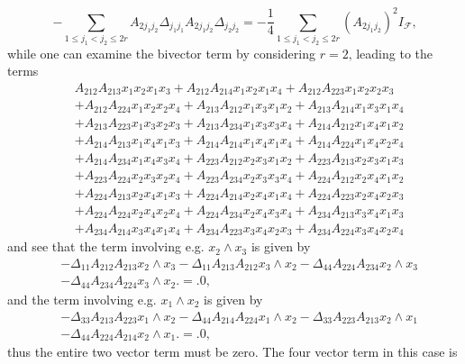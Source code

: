 \documentclass[aps, preprint]{revtex4}
\begin{document}
\begin{equation} -\sum _{1 \leq j_{1} <j_{2} \leq 2 r}A_{2 j_{1} j_{2}}  \Delta _{j_{1} j_{1}}A_{2 j_{1} j_{2}} \Delta _{j_{2} j_{2}} = -\frac{1}{4} \sum _{1 \leq j_{1} <j_{2} \leq 2 r}\left (A_{2 j_{1} j_{2}}\right )^{2} I_{\mathcal{F}}\text{,}
\end{equation}while one can examine the bivector term by considering $r =2\text{,}$ leading to the terms
\begin{align} & A_{2 1 2} A_{2 1 3} x_{1} x_{2} x_{1} x_{3} +A_{2 1 2} A_{2 1 4} x_{1} x_{2} x_{1} x_{4} +A_{2 1 2} A_{2 2 3} x_{1} x_{2} x_{2} x_{3} \nonumber  \\
 &  +A_{2 1 2} A_{2 2 4} x_{1} x_{2} x_{2} x_{4} +A_{2 1 3} A_{2 1 2} x_{1} x_{3} x_{1} x_{2} +A_{2 1 3} A_{2 1 4} x_{1} x_{3} x_{1} x_{4} \nonumber  \\
 &  +A_{2 1 3} A_{2 2 3} x_{1} x_{3} x_{2} x_{3} +A_{2 1 3} A_{2 3 4} x_{1} x_{3} x_{3} x_{4} +A_{2 1 4} A_{2 1 2} x_{1} x_{4} x_{1} x_{2} \nonumber  \\
 &  +A_{2 1 4} A_{2 1 3} x_{1} x_{4} x_{1} x_{3} +A_{2 1 4} A_{2 1 4} x_{1} x_{4} x_{1} x_{4} +A_{2 1 4} A_{2 2 4} x_{1} x_{4} x_{2} x_{4} \nonumber  \\
 &  +A_{2 1 4} A_{2 3 4} x_{1} x_{4} x_{3} x_{4} +A_{2 2 3} A_{2 1 2} x_{2} x_{3} x_{1} x_{2} +A_{2 2 3} A_{2 1 3} x_{2} x_{3} x_{1} x_{3} \nonumber  \\
 &  +A_{2 2 3} A_{2 2 4} x_{2} x_{3} x_{2} x_{4} +A_{2 2 3} A_{2 3 4} x_{2} x_{3} x_{3} x_{4} +A_{2 2 4} A_{2 1 2} x_{2} x_{4} x_{1} x_{2} \nonumber  \\
 &  +A_{2 2 4} A_{2 1 3} x_{2} x_{4} x_{1} x_{3} +A_{2 2 4} A_{2 1 4} x_{2} x_{4} x_{1} x_{4} +A_{2 2 4} A_{2 2 3} x_{2} x_{4} x_{2} x_{3} \nonumber  \\
 &  +A_{2 2 4} A_{2 2 4} x_{2} x_{4} x_{2} x_{4} +A_{2 2 4} A_{2 3 4} x_{2} x_{4} x_{3} x_{4} +A_{2 3 4} A_{2 1 3} x_{3} x_{4} x_{1} x_{3} \nonumber  \\
 &  +A_{2 3 4} A_{2 1 4} x_{3} x_{4} x_{1} x_{4} +A_{2 3 4} A_{2 2 3} x_{3} x_{4} x_{2} x_{3} +A_{2 3 4} A_{2 2 4} x_{3} x_{4} x_{2} x_{4}\end{align}and see that the term involving e.g. $x_{2} \wedge x_{3}$ is given by
\begin{align} &  - \Delta _{1 1}A_{2 1 2} A_{2 1 3} x_{2} \wedge x_{3} - \Delta _{1 1}A_{2 1 3} A_{2 1 2} x_{3} \wedge x_{2} - \Delta _{4 4}A_{2 2 4} A_{2 3 4} x_{2} \wedge x_{3} \nonumber  \\
 &  - \Delta _{4 4}A_{2 3 4} A_{2 2 4} x_{3} \wedge x_{2}. =.0\text{,}\end{align}and the term involving e.g. $x_{1} \wedge x_{2}$ is given by
\begin{align} &  - \Delta _{3 3}A_{2 1 3} A_{2 2 3} x_{1} \wedge x_{2} - \Delta _{4 4}A_{2 1 4} A_{2 2 4} x_{1} \wedge x_{2} - \Delta _{3 3}A_{2 2 3} A_{2 1 3} x_{2} \wedge x_{1} \nonumber  \\
 &  - \Delta _{4 4}A_{2 2 4} A_{2 1 4} x_{2} \wedge x_{1}. =.0\text{,}\end{align}thus the entire two vector term must be zero. The four vector term in this case is 
\end{document}
